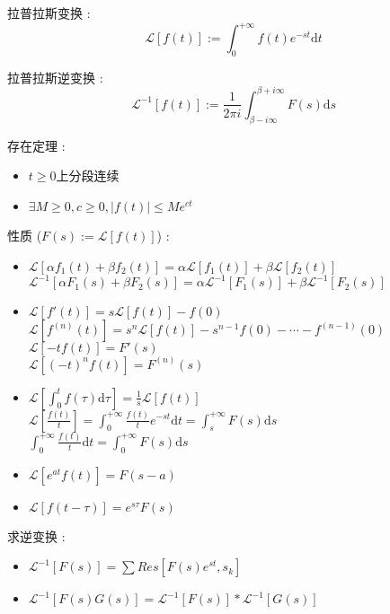 \documentclass[UTF8, 12pt]{ctexart}
\begin{document}
	
	拉普拉斯变换 : \[ \mathscr{L}[f(t)] := \int_{0}^{+\infty}f(t)e^{-st}\mathrm{d}t \]	

	拉普拉斯逆变换 : \[ \mathscr{L}^{-1}[f(t)] := \frac{1}{2\pi i}\int_{\beta-i\infty}^{\beta+i\infty}F(s)\mathrm{d}s \]

	存在定理 : 
	\begin{itemize}[leftmargin = 4em]
		\item $ t \geq 0 $上分段连续
		\item $ \exists M \geq 0, c \geq 0, |f(t)| \leq Me^{ct} $
	\end{itemize}

	性质 ($ F(s) := \mathscr{L}[f(t)] $) : 
	\begin{itemize}[leftmargin = 4em]
		\item $ \mathscr{L}[\alpha f_1(t) + \beta f_2(t)] = \alpha\mathscr{L}[f_1(t)] + \beta\mathscr{L}[f_2(t)] $ \\
				$ \mathscr{L}^{-1}[\alpha F_1(s) + \beta F_2(s)] = \alpha\mathscr{L}^{-1}[F_1(s)] + \beta\mathscr{L}^{-1}[F_2(s)] $
		\item $ \mathscr{L}[f'(t)] = s\mathscr{L}[f(t)] - f(0) $ \\
				$ \mathscr{L}[f^{(n)}(t)] = s^{n}\mathscr{L}[f(t)] - s^{n-1}f(0) - \cdots - f^{(n-1)}(0) $ \\
				$ \mathscr{L}[-tf(t)] = F'(s) $ \\
				$ \mathscr{L}[(-t)^{n}f(t)] = F^{(n)}(s) $
		\item $ \mathscr{L}[\int_{0}^{t}f(\tau)\mathrm{d}\tau] = \frac{1}{s}\mathscr{L}[f(t)] $ \\
				$ \mathscr{L}[\frac{f(t)}{t}] = \int_0^{+\infty}\frac{f(t)}{t}e^{-st}\mathrm{d}t = \int_{s}^{+\infty}F(s)\mathrm{d}s $ \\
				$ \int_{0}^{+\infty}\frac{f(t)}{t}\mathrm{d}t = \int_{0}^{+\infty}F(s)\mathrm{d}s $
		\item $ \mathscr{L}[e^{at}f(t)] = F(s-a) $
		\item $ \mathscr{L}[f(t-\tau)] = e^{s\tau}F(s) $ 
	\end{itemize}

	求逆变换 :
	\begin{itemize}[leftmargin = 4em]
		\item $ \mathscr{L}^{-1}[F(s)] = \sum Res[F(s)e^{st}, s_k] $
		\item $ \mathscr{L}^{-1}[F(s)G(s)] = \mathscr{L}^{-1}[F(s)] * \mathscr{L}^{-1}[G(s)] $
	\end{itemize}
\end{document}
